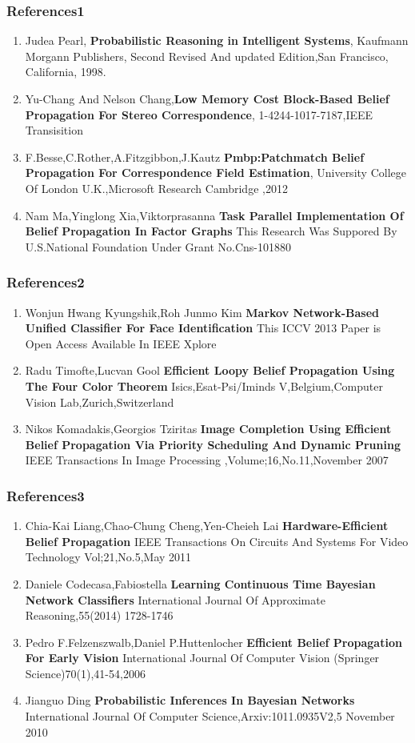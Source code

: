 \documentclass{beamer}
\begin{document}
\begin{frame}
\frametitle{References1}
\begin{enumerate}
\item Judea Pearl, \textbf{Probabilistic Reasoning in Intelligent Systems},
Kaufmann Morgann Publishers, Second Revised And updated Edition,San Francisco, California, 1998.
\item Yu-Chang And Nelson Chang,\textbf{Low Memory Cost Block-Based Belief Propagation For Stereo Correspondence},
1-4244-1017-7187,IEEE Transisition
\item F.Besse,C.Rother,A.Fitzgibbon,J.Kautz
\textbf{Pmbp:Patchmatch Belief Propagation For Correspondence Field Estimation},
University College Of London U.K.,Microsoft Research Cambridge ,2012
\item Nam Ma,Yinglong Xia,Viktorprasanna
\textbf{Task Parallel Implementation Of Belief Propagation In Factor Graphs}
This Research Was Suppored By U.S.National Foundation Under Grant No.Cns-101880
\end{enumerate}
\end{frame}
\begin{frame}
\frametitle{References2}
\begin{enumerate}
\item Wonjun Hwang Kyungshik,Roh Junmo Kim
\textbf{Markov Network-Based Unified Classifier For Face Identification}
This ICCV 2013 Paper is Open Access Available In IEEE Xplore
\item Radu Timofte,Lucvan Gool
\textbf{Efficient Loopy Belief Propagation Using The Four Color Theorem}
Isics,Esat-Psi/Iminds V,Belgium,Computer Vision Lab,Zurich,Switzerland
\item Nikos Komadakis,Georgios Tziritas
\textbf{Image Completion Using Efficient Belief Propagation Via Priority Scheduling And Dynamic Pruning}
IEEE Transactions In Image Processing ,Volume;16,No.11,November 2007
\end{enumerate}
\end{frame}
\begin{frame}
\frametitle{References3}
\begin{enumerate}
\item Chia-Kai Liang,Chao-Chung Cheng,Yen-Cheieh Lai
\textbf{Hardware-Efficient Belief Propagation}
IEEE Transactions On Circuits And Systems For Video Technology Vol;21,No.5,May 2011
\item Daniele Codecasa,Fabiostella
\textbf{Learning Continuous Time Bayesian Network Classifiers}
International Journal Of Approximate Reasoning,55(2014) 1728-1746
\item Pedro F.Felzenszwalb,Daniel P.Huttenlocher
\textbf{Efficient Belief Propagation For Early Vision}
International Journal Of Computer Vision (Springer Science)70(1),41-54,2006
\item Jianguo Ding
\textbf{Probabilistic Inferences In Bayesian Networks}
International Journal Of Computer Science,Arxiv:1011.0935V2,5 November 2010
\end{enumerate}
\end{frame}








\end{document}
